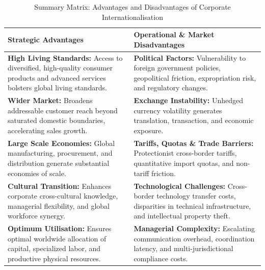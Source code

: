 \begin{table}[htbp]
    \centering
    \small
    \renewcommand{\arraystretch}{1.3}
    \begin{tabularx}{\textwidth}{XX}
        \toprule
        \textbf{Strategic Advantages} & \textbf{Operational \& Market Disadvantages} \\
        \midrule
        \textbf{High Living Standards:} Access to diversified, high-quality consumer products and advanced services bolsters global living standards. &
        \textbf{Political Factors:} Vulnerability to foreign government policies, geopolitical friction, expropriation risk, and regulatory changes. \\
        
        \textbf{Wider Market:} Broadens addressable customer reach beyond saturated domestic boundaries, accelerating sales growth. &
        \textbf{Exchange Instability:} Unhedged currency volatility generates translation, transaction, and economic exposure. \\
        
        \textbf{Large Scale Economies:} Global manufacturing, procurement, and distribution generate substantial economies of scale. &
        \textbf{Tariffs, Quotas \& Trade Barriers:} Protectionist cross-border tariffs, quantitative import quotas, and non-tariff friction. \\
        
        \textbf{Cultural Transition:} Enhances corporate cross-cultural knowledge, managerial flexibility, and global workforce synergy. &
        \textbf{Technological Challenges:} Cross-border technology transfer costs, disparities in technical infrastructure, and intellectual property theft. \\
        
        \textbf{Optimum Utilisation:} Ensures optimal worldwide allocation of capital, specialized labor, and productive physical resources. &
        \textbf{Managerial Complexity:} Escalating communication overhead, coordination latency, and multi-jurisdictional compliance costs. \\
        \bottomrule
    \end{tabularx}
    \caption{Summary Matrix: Advantages and Disadvantages of Corporate Internationalisation}
    \label{tab:internationalisation_pros_cons}
\end{table}

